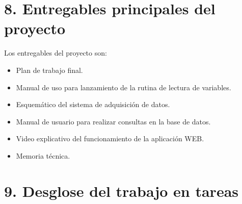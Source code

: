 \documentclass[
11pt, %
codirector, %
]{charter}
\begin{document}
\section{8. Entregables principales del proyecto}
\label{sec:entregables}



Los entregables del proyecto son:

\begin{itemize}
	\item Plan de trabajo final.
	\item Manual de uso para lanzamiento de la rutina de lectura de variables.
	\item Esquemático del sistema de adquisición de datos.
	\item Manual de usuario para realizar consultas en la base de datos.
	\item Video explicativo del funcionamiento de la aplicación WEB.
	\item Memoria técnica.
	
\end{itemize}


\section{9. Desglose del trabajo en tareas}
\label{sec:wbs}
\end{document}
